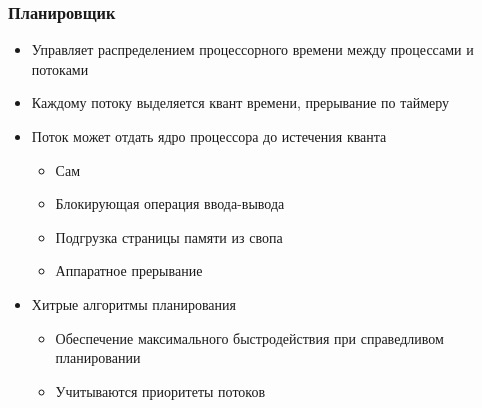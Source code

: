 \documentclass{../../slides-style}
\begin{document}
    \begin{frame}
        \frametitle{Планировщик}
        \begin{itemize}
            \item Управляет распределением процессорного времени между процессами и потоками
            \item Каждому потоку выделяется квант времени, прерывание по таймеру
            \item Поток может отдать ядро процессора до истечения кванта
            \begin{itemize}
                \item Сам
                \item Блокирующая операция ввода-вывода
                \item Подгрузка страницы памяти из свопа
                \item Аппаратное прерывание
            \end{itemize}
            \item Хитрые алгоритмы планирования
            \begin{itemize}
                \item Обеспечение максимального быстродействия при справедливом планировании
                \item Учитываются приоритеты потоков
            \end{itemize}
        \end{itemize}
    \end{frame}
\end{document}
